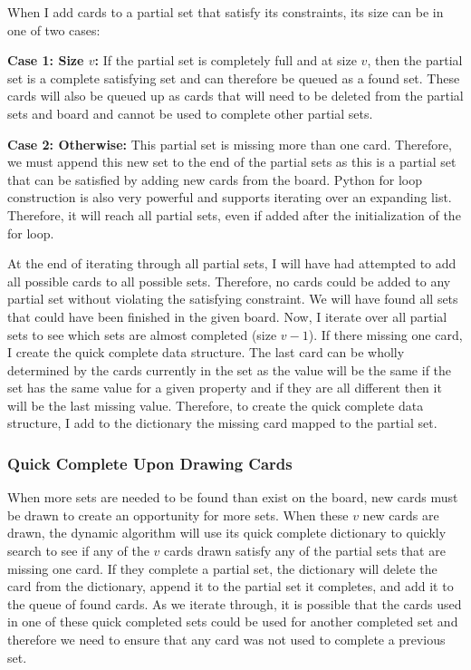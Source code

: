 \documentclass[pageno]{jpaper}
\begin{document}
When I add cards to a partial set that satisfy its constraints, its size can be in one of two cases:

\textbf{Case 1: Size $v$:} If the partial set is completely full and at size $v$, then the partial set is a complete satisfying set and can therefore be queued as a found set. These cards will also be queued up as cards that will need to be deleted from the partial sets and board and cannot be used to complete other partial sets.

\textbf{Case 2: Otherwise:} This partial set is missing more than one card. Therefore, we must append this new set to the end of the partial sets as this is a partial set that can be satisfied by adding new cards from the board. Python for loop construction is also very powerful and supports iterating over an expanding list. Therefore, it will reach all partial sets, even if added after the initialization of the for loop. 

At the end of iterating through all partial sets, I will have had attempted to add all possible cards to all possible sets. Therefore, no cards could be added to any partial set without violating the satisfying constraint. We will have found all sets that could have been finished in the given board. Now, I iterate over all partial sets to see which sets are almost completed (size $v-1$). If there missing one card, I create the quick complete data structure. The last card can be wholly determined by the cards currently in the set as the value will be the same if the set has the same value for a given property and if they are all different then it will be the last missing value. Therefore, to create the quick complete data structure, I add to the dictionary the missing card mapped to the partial set. 

\subsubsection{Quick Complete Upon Drawing Cards}

When more sets are needed to be found than exist on the board, new cards must be drawn to create an opportunity for more sets. When these $v$ new cards are drawn, the dynamic algorithm will use its quick complete dictionary to quickly search to see if any of the $v$ cards drawn satisfy any of the partial sets that are missing one card. If they complete a partial set, the dictionary will delete the card from the dictionary, append it to the partial set it completes, and add it to the queue of found cards. As we iterate through, it is possible that the cards used in one of these quick completed sets could be used for another completed set and therefore we need to ensure that any card was not used to complete a previous set. 
\end{document}
